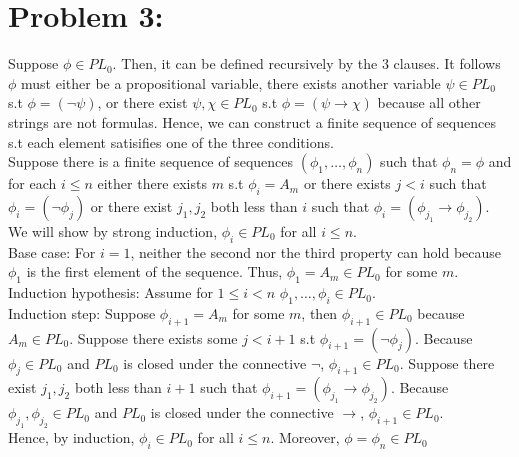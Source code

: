 \documentclass[10pt]{article}
\begin{document}
\section*{Problem 3:}
Suppose $\phi\in PL_0$. Then, it can be defined recursively by the $3$ clauses. 
It follows $\phi$ must either be a propositional variable, there exists another variable $\psi\in PL_0$ s.t $\phi=(\lnot \psi)$, or there exist $\psi,\chi\in PL_0$ s.t $\phi=(\psi\rightarrow\chi)$ because all other strings are not formulas. 
Hence, we can construct a finite sequence of sequences s.t each element satisifies one of the three conditions.\\
Suppose there is a finite sequence of sequences $(\phi_1,\ldots,\phi_n)$ such that $\phi_n=\phi$ and for each $i\le n$ either there exists $m$ s.t $\phi_i=A_m$ or there exists $j<i$ such that $\phi_i=(\lnot\phi_j)$ or there exist $j_1,j_2$ both less than $i$ such that $\phi_i=(\phi_{j_1}\rightarrow\phi_{j_2})$.\\
We will show by strong induction, $\phi_i\in PL_0$ for all $i\le n$.\\
Base case: For $i=1$, neither the second nor the third property can hold because $\phi_1$ is the first element of the sequence. Thus, $\phi_1=A_m\in PL_0$ for some $m$.\\
Induction hypothesis: Assume for  $1\le i<n$ $\phi_1,\ldots,\phi_i\in PL_0$.\\
Induction step: Suppose $\phi_{i+1}=A_m$ for some $m$, then $\phi_{i+1}\in PL_0$ because $A_m\in PL_0$. 
Suppose there exists some $j<i+1$ s.t $\phi_{i+1}=(\lnot\phi_j)$. 
Because $\phi_j\in PL_0$ and $PL_0$ is closed under the connective $\lnot$, $\phi_{i+1}\in PL_0$. 
Suppose there exist $j_1,j_2$ both less than $i+1$ such that $\phi_{i+1}=(\phi_{j_1}\rightarrow\phi_{j_2})$. 
Because $\phi_{j_1},\phi_{j_2}\in PL_0$ and $PL_0$ is closed under the connective $\rightarrow$, $\phi_{i+1}\in PL_0$.\\
Hence, by induction, $\phi_i\in PL_0$ for all $i\le n$. Moreover, $\phi=\phi_n\in PL_0$
\end{document}
